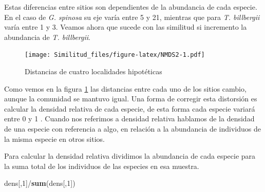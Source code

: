\documentclass[]{book}
\newenvironment{Shaded}{\begin{snugshade}}{\end{snugshade}}
\newcommand{\KeywordTok}[1]{\textcolor[rgb]{0.13,0.29,0.53}{\textbf{{#1}}}}
\newcommand{\DataTypeTok}[1]{\textcolor[rgb]{0.13,0.29,0.53}{{#1}}}
\newcommand{\DecValTok}[1]{\textcolor[rgb]{0.00,0.00,0.81}{{#1}}}
\newcommand{\FloatTok}[1]{\textcolor[rgb]{0.00,0.00,0.81}{{#1}}}
\newcommand{\StringTok}[1]{\textcolor[rgb]{0.31,0.60,0.02}{{#1}}}
\newcommand{\NormalTok}[1]{{#1}}
\begin{document}
Estas diferencias entre sitios son dependientes de la abundancia de cada
especie. En el caso de \emph{G. spinosa} su eje varía entre 5 y 21,
mientras que para \emph{T. billbergii} varía entre 1 y 3. Veamos ahora
que sucede con las similitud si incremento la abundancia de \emph{T.
billbergii}.

\begin{Shaded}
\end{Shaded}

\begin{figure}[htbp]
\centering
\texttt{[image: Similitud\_files/figure-latex/NMDS2-1.pdf]}
\caption{\label{fig:NMDS2}Distancias de cuatro localidades hipotéticas}
\end{figure}

Como vemos en la figura \ref{fig:NMDS2} las distancias entre cada uno de
los sitios cambio, aunque la comunidad se mantuvo igual. Una forma de
corregir esta distorsión es calcular la densidad relativa de cada
especie, de esta forma cada especie variará entre 0 y 1
\citep{Stevens2009}. Cuando nos referimos a densidad relativa hablamos
de la densidad de una especie con referencia a algo, en relación a la
abundancia de individuos de la misma especie en otros sitios.

Para calcular la densidad relativa dividimos la abundancia de cada
especie para la suma total de los individuos de las especies en esa
muestra.

\begin{Shaded}
\begin{Highlighting}[]
\NormalTok{dens[,}\DecValTok{1}\NormalTok{]/}\KeywordTok{sum}\NormalTok{(dens[,}\DecValTok{1}\NormalTok{])}
\end{Highlighting}
\end{Shaded}
\end{document}
